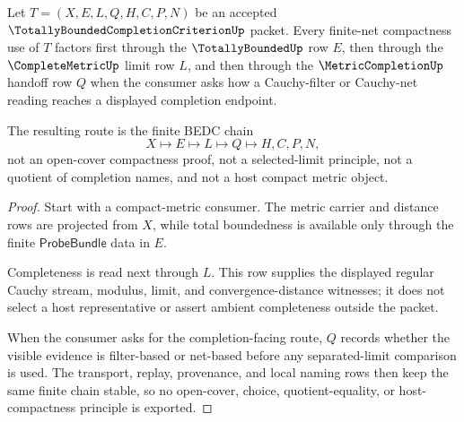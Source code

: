 \begin{theorem}
\label{thm:totally-bounded-completion-criterion-finite-net-route}
Let $T=(X,E,L,Q,H,C,P,N)$ be an accepted $\TotallyBoundedCompletionCriterionUp$ packet. Every finite-net compactness use of $T$ factors first through the $\TotallyBoundedUp$ row $E$, then through the $\CompleteMetricUp$ limit row $L$, and then through the $\MetricCompletionUp$ handoff row $Q$ when the consumer asks how a Cauchy-filter or Cauchy-net reading reaches a displayed completion endpoint.

The resulting route is the finite BEDC chain
$$
X\longmapsto E\longmapsto L\longmapsto Q\longmapsto H,C,P,N ,
$$
not an open-cover compactness proof, not a selected-limit principle, not a quotient of completion names, and not a host compact metric object.
\end{theorem}
\begin{proof}
Start with a compact-metric consumer. The metric carrier and distance rows are projected from $X$, while total boundedness is available only through the finite $\mathsf{ProbeBundle}$ data in $E$.

Completeness is read next through $L$. This row supplies the displayed regular Cauchy stream, modulus, limit, and convergence-distance witnesses; it does not select a host representative or assert ambient completeness outside the packet.

When the consumer asks for the completion-facing route, $Q$ records whether the visible evidence is filter-based or net-based before any separated-limit comparison is used. The transport, replay, provenance, and local naming rows then keep the same finite chain stable, so no open-cover, choice, quotient-equality, or host-compactness principle is exported.
\end{proof}


\begin{closurestatus}{\TotallyBoundedCompletionCriterionUp}
  \theoryclosure{\seedClosure}
  \formalstatus{\unformalizedV}
\end{closurestatus}
